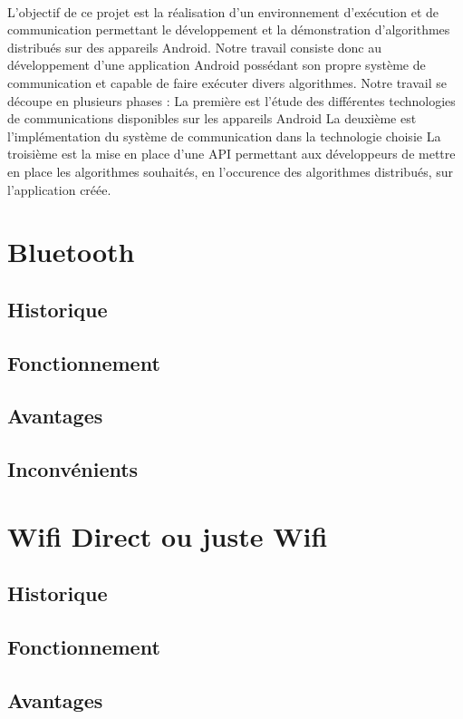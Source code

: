 \documentclass[a4paper,10pt]{report}
\begin{document}
  \paragraph{}
  L'objectif de ce projet est la réalisation d'un environnement d'exécution et de communication permettant le développement et la démonstration d'algorithmes distribués sur des appareils Android. Notre travail consiste donc au développement d'une application Android possédant son propre système de communication et capable de faire exécuter divers algorithmes.
  Notre travail se découpe en plusieurs phases :
  La première est l'étude des différentes technologies de communications disponibles sur les appareils Android
  La deuxième est l'implémentation du système de communication dans la technologie choisie
  La troisième est la mise en place d'une API permettant aux développeurs de mettre en place les algorithmes souhaités, en l'occurence des algorithmes distribués, sur l'application créée.
  \section{Bluetooth}
    \subsection{Historique}
    \subsection{Fonctionnement} 
    \subsection{Avantages}
    \subsection{Inconvénients}
  \section{Wifi Direct ou juste Wifi} 
    \subsection{Historique}
    \subsection{Fonctionnement}
    \subsection{Avantages}
\end{document}
